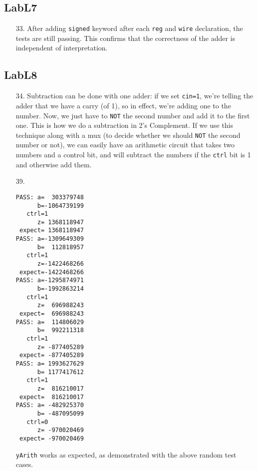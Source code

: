 \documentclass{article}
\begin{document}
\subsection{LabL7}
\begin{enumerate}
\item[33. ] After adding \verb$signed$ keyword after each \verb$reg$ and \verb$wire$ declaration, the tests are still passing. This confirms that the correctness of the adder is independent of interpretation.
\end{enumerate}

\subsection{LabL8}
\begin{enumerate}
\item[34. ] Subtraction can be done with one adder: if we set \verb$cin=1$, we're telling the adder that we have a carry (of 1), so in effect, we're adding one to the number. Now, we just have to \verb$NOT$ the second number and add it to the first one. This is how we do a subtraction in 2's Complement. If we use this technique along with a mux (to decide whether we should \verb$NOT$ the second number or not), we can easily have an arithmetic circuit that takes two numbers and a control bit, and will subtract the numbers if the \verb$ctrl$ bit is 1 and otherwise add them.

\item[39. ]
\begin{verbatim}
PASS: a=  303379748
      b=-1064739199
   ctrl=1
      z= 1368118947
 expect= 1368118947
PASS: a=-1309649309
      b=  112818957
   ctrl=1
      z=-1422468266
 expect=-1422468266
PASS: a=-1295874971
      b=-1992863214
   ctrl=1
      z=  696988243
 expect=  696988243
PASS: a=  114806029
      b=  992211318
   ctrl=1
      z= -877405289
 expect= -877405289
PASS: a= 1993627629
      b= 1177417612
   ctrl=1
      z=  816210017
 expect=  816210017
PASS: a= -482925370
      b= -487095099
   ctrl=0
      z= -970020469
 expect= -970020469
\end{verbatim}
  \verb$yArith$ works as expected, as demonstrated with the above random test cases.
\end{enumerate}
\end{document}
